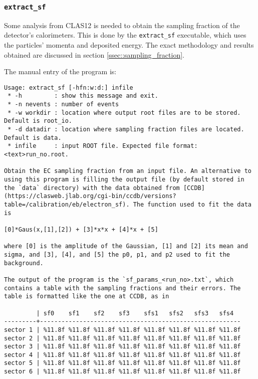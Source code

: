 \subsubsection{\texttt{extract\_sf}}
    Some analysis from CLAS12 is needed to obtain the sampling fraction of the detector's calorimeters.
    This is done by the \texttt{extract\_sf} executable, which uses the particles' momenta and deposited energy.
    The exact methodology and results obtained are discussed in section \ref{ssec::sampling_fraction}.
    
    The manual entry of the program is:
    \begin{lstlisting}
Usage: extract_sf [-hfn:w:d:] infile
 * -h         : show this message and exit.
 * -n nevents : number of events
 * -w workdir : location where output root files are to be stored. Default is root_io.
 * -d datadir : location where sampling fraction files are located. Default is data.
 * infile     : input ROOT file. Expected file format: <text>run_no.root.

Obtain the EC sampling fraction from an input file. An alternative to using this program is filling the output file (by default stored in the `data` directory) with the data obtained from [CCDB](https://clasweb.jlab.org/cgi-bin/ccdb/versions?table=/calibration/eb/electron_sf). The function used to fit the data is

[0]*Gaus(x,[1],[2]) + [3]*x*x + [4]*x + [5]

where [0] is the amplitude of the Gaussian, [1] and [2] its mean and sigma, and [3], [4], and [5] the p0, p1, and p2 used to fit the background.

The output of the program is the `sf_params_<run_no>.txt`, which contains a table with the sampling fractions and their errors. The table is formatted like the one at CCDB, as in

         | sf0    sf1    sf2    sf3    sfs1   sfs2   sfs3   sfs4
---------+--------------------------------------------------------
sector 1 | %11.8f %11.8f %11.8f %11.8f %11.8f %11.8f %11.8f %11.8f
sector 2 | %11.8f %11.8f %11.8f %11.8f %11.8f %11.8f %11.8f %11.8f
sector 3 | %11.8f %11.8f %11.8f %11.8f %11.8f %11.8f %11.8f %11.8f
sector 4 | %11.8f %11.8f %11.8f %11.8f %11.8f %11.8f %11.8f %11.8f
sector 5 | %11.8f %11.8f %11.8f %11.8f %11.8f %11.8f %11.8f %11.8f
sector 6 | %11.8f %11.8f %11.8f %11.8f %11.8f %11.8f %11.8f %11.8f
    \end{lstlisting}

